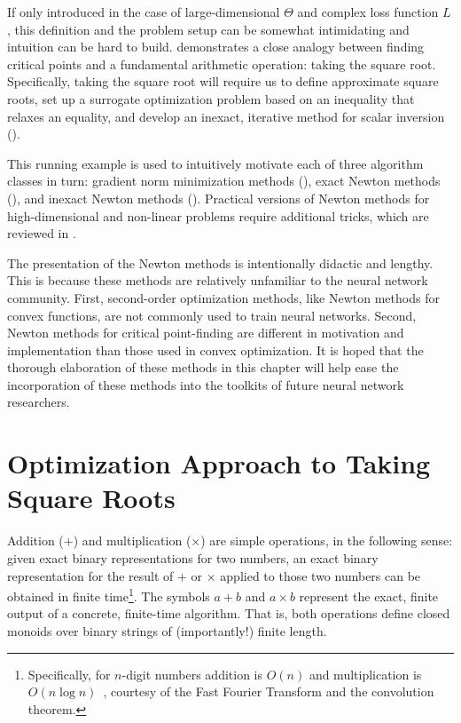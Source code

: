 \documentclass[../../thesis.tex]{subfiles}
\begin{document}
If only introduced in the case of large-dimensional $\Theta$
and complex loss function $L$,
this definition and the problem setup can be somewhat intimidating
and intuition can be hard to build.
 demonstrates a close analogy
between finding critical points
and a fundamental arithmetic operation:
taking the square root.
Specifically,
taking the square root will require us to define
approximate square roots,
set up a surrogate optimization problem based
on an inequality that relaxes an equality,
and develop an inexact, iterative method for scalar inversion
().

This running example is used to intuitively motivate
each of three algorithm classes in turn:
gradient norm minimization methods (),
exact Newton methods (),
and inexact Newton methods ().
Practical versions of Newton methods
for high-dimensional and non-linear problems
require additional tricks,
which are reviewed in .

The presentation of the Newton methods
is intentionally didactic and lengthy.
This is because these methods are relatively unfamiliar
to the neural network community.
First,
second-order optimization methods,
like Newton methods for convex functions,
are not commonly used to train neural networks.
Second,
Newton methods for critical point-finding
are different in motivation
and implementation than those used in
convex optimization.
It is hoped that the
thorough elaboration of these methods
in this chapter will help ease
the incorporation of these methods
into the toolkits of future neural network researchers.

\section{Optimization Approach to Taking Square Roots}

Addition ($+$) and multiplication ($\times$)
are simple operations, in the following sense:
given exact binary representations for two numbers,
an exact binary representation for the result of $+$ or $\times$
applied to those two numbers can be obtained in finite time\footnote{%
Specifically, for $n$-digit numbers addition is $O(n)$ and
multiplication is $O(n\log n)$~\cite{harvey2019},
courtesy of the Fast Fourier Transform and the convolution theorem.}.
The symbols $a + b$ and $a \times b$ represent the exact, finite output
of a concrete, finite-time algorithm.
That is, both operations define closed monoids over
binary strings of
(importantly!) finite length.
\end{document}
